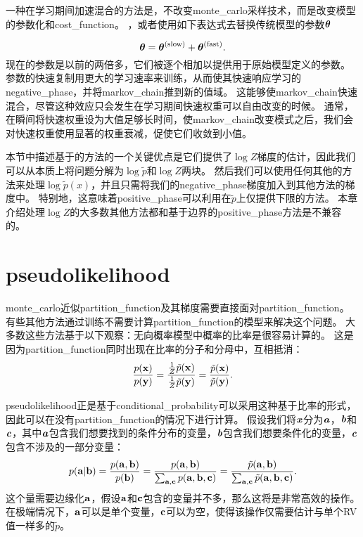 一种在学习期间加速混合的方法是，不改变\gls{monte_carlo}采样技术，而是改变模型的参数化和\gls{cost_function}。
，或者\citep{TielemanT2009-small}使用如下表达式去替换传统模型的参数$\boldsymbol{\theta}$

\begin{equation}
	\boldsymbol{\theta} = \boldsymbol{\theta}^{\text{(slow)}} + \boldsymbol{\theta}^{\text{(fast)}}.
\end{equation}
现在的参数是以前的两倍多，它们被逐个相加以提供用于原始模型定义的参数。
参数的快速复制用更大的学习速率来训练，从而使其快速响应学习的\gls{negative_phase}，并将\gls{markov_chain}推到新的值域。
这能够使\gls{markov_chain}快速混合，尽管这种效应只会发生在学习期间快速权重可以自由改变的时候。
通常，在瞬间将快速权重设为大值足够长时间，使\gls{markov_chain}改变模式之后，我们会对快速权重使用显著的权重衰减，促使它们收敛到小值。


本节中描述基于的方法的一个关键优点是它们提供了$\log Z$梯度的估计，因此我们可以从本质上将问题分解为$\log \tilde{p}$和$\log Z$两块。
然后我们可以使用任何其他的方法来处理$\log \tilde{p}(x)$，并且只需将我们的\gls{negative_phase}梯度加入到其他方法的梯度中。
特别地，这意味着\gls{positive_phase}可以利用在$\tilde{p}$上仅提供下限的方法。
本章介绍处理$\log Z$的大多数其他方法都和基于边界的\gls{positive_phase}方法是不兼容的。


\section{\gls{pseudolikelihood}}
\label{sec:pseudolikelihood}
\gls{monte_carlo}近似\gls{partition_function}及其梯度需要直接面对\gls{partition_function}。
有些其他方法通过训练不需要计算\gls{partition_function}的模型来解决这个问题。
大多数这些方法基于以下观察：无向概率模型中概率的比率是很容易计算的。
这是因为\gls{partition_function}同时出现在比率的分子和分母中，互相抵消：
\begin{equation}
	\frac{p(\mathbf{x})}{ p(\mathbf{y}) } = \frac{ \frac{1}{Z} \tilde{p}(\mathbf{x}) }{ \frac{1}{Z} \tilde{p}(\mathbf{y}) } =
\frac{ \tilde{p}(\mathbf{x}) }{ \tilde{p}(\mathbf{y}) }.
\end{equation}


\gls{pseudolikelihood}正是基于\gls{conditional_probability}可以采用这种基于比率的形式，因此可以在没有\gls{partition_function}的情况下进行计算。
假设我们将$\boldsymbol{\mathit{x}}$分为$\boldsymbol{\mathit{a}}$，$\boldsymbol{\mathit{b}}$和$\boldsymbol{\mathit{c}}$，其中$\boldsymbol{\mathit{a}}$包含我们想要找到的条件分布的变量，$\boldsymbol{\mathit{b}}$包含我们想要条件化的变量，$\boldsymbol{\mathit{c}}$包含不涉及的一部分变量：
\begin{equation}
	p(\mathbf{a} | \mathbf{b}) = \frac{ p(\mathbf{a}, \mathbf{b}) }{ p(\mathbf{b}) } = \frac{p(\mathbf{a}, \mathbf{b})}{ \sum_{\mathbf{a}, \mathbf{c}} p(\mathbf{a}, \mathbf{b}, \mathbf{c}) } = \frac{ \tilde{p}(\mathbf{a}, \mathbf{b}) }{ \sum_{\mathbf{a}, \mathbf{c}} \tilde{p}(\mathbf{a}, \mathbf{b}, \mathbf{c}) }.
\end{equation}
这个量需要边缘化$\mathbf{a}$，假设$\mathbf{a}$和$\mathbf{c}$包含的变量并不多，那么这将是非常高效的操作。
在极端情况下，$\mathbf{a}$可以是单个变量，$\mathbf{c}$可以为空，使得该操作仅需要估计与单个\gls{RV}值一样多的$\tilde{p}$。


